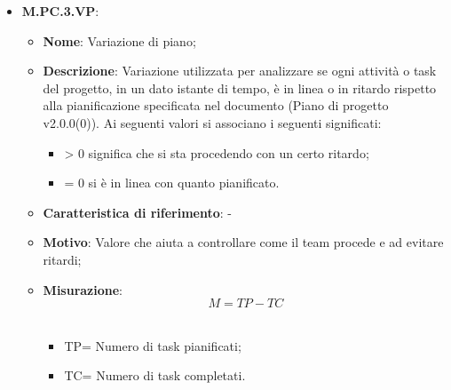\documentclass[10pt, a4paper]{article}
\begin{document}
\begin{itemize}
    
    \item \textbf{M.PC.3.VP}:
    \begin{itemize}
        \item \textbf{Nome}: Variazione di piano;
        \item \textbf{Descrizione}: Variazione utilizzata per analizzare se ogni attività o task del progetto, in un dato istante di tempo, è in linea o in ritardo rispetto alla pianificazione specificata nel documento (Piano di progetto v2.0.0(0)).  Ai seguenti valori si associano i seguenti significati:
        \begin{itemize}
            \item > 0 significa che si sta procedendo con un certo ritardo;
            \item = 0 si è in linea con quanto pianificato.
        \end{itemize}
        \item \textbf{Caratteristica di riferimento}: -
        \item \textbf{Motivo}: Valore che aiuta a controllare come il team procede e ad evitare ritardi;
        \item \textbf{Misurazione}: \  \[ M=TP-TC \] \\
        \begin{itemize}
        \item TP= Numero di task pianificati;
        \item TC= Numero di task completati.\\
        \end{itemize}
    \end{itemize}


\end{itemize}
\end{document}
